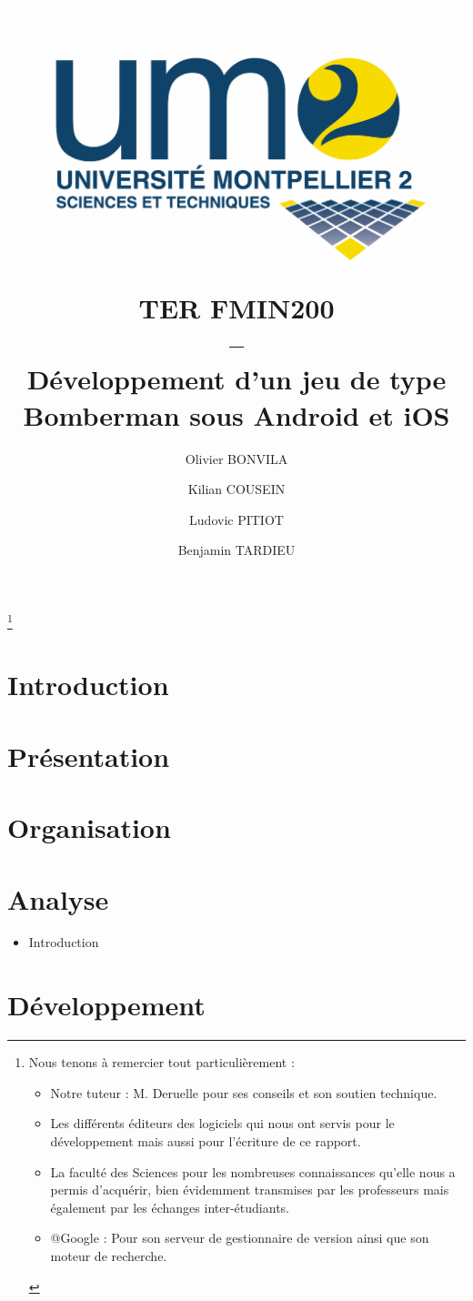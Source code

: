 \documentclass[a4paper,11pt]{report}
\title{
	\includegraphics[scale=.2]{logofds.eps}\\
	\vspace*{1cm}
	TER FMIN200 \\ 
	-- \\
	Développement d'un jeu de type Bomberman sous Android et iOS
}
\author{Olivier BONVILA \and Kilian COUSEIN \and Ludovic PITIOT \and Benjamin TARDIEU}
\date{}
\begin{document}
\maketitle

\thanks {
  	Nous tenons à remercier tout particulièrement :
	\begin{itemize}
		\item Notre tuteur : M. Deruelle pour ses conseils et son soutien technique.
		\item Les différents  éditeurs des logiciels qui nous ont servis pour le développement mais aussi pour l’écriture de ce rapport.
		\item La faculté des Sciences pour les nombreuses connaissances qu’elle nous a permis d’acquérir, bien évidemment transmises par les professeurs mais également par les échanges inter-étudiants.
		\item @Google : Pour son serveur de gestionnaire de version ainsi que son moteur de recherche.
	\end{itemize}
}

\tableofcontents



\chapter{Introduction}

	

\chapter{Présentation}

	
	

\chapter{Organisation}

	
	
	
\chapter{Analyse}
	\begin{itemize}
		\item Introduction
	\end{itemize}
	
	


\chapter{Développement}
\end{document}
